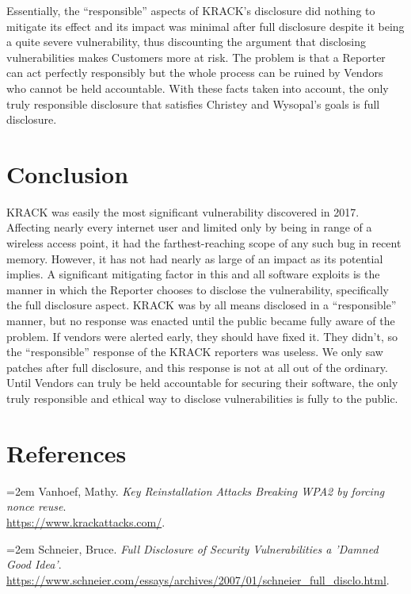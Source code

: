 \documentclass[12pt]{article}
\begin{document}
\begin{doublespace}
Essentially, the ``responsible'' aspects of KRACK's disclosure did nothing to
mitigate its effect and its impact was minimal after full disclosure despite it
being a quite severe vulnerability, thus discounting the argument that
disclosing vulnerabilities makes Customers more at risk. The problem is that a
Reporter can act perfectly
responsibly but the whole process can be ruined by Vendors who cannot be held
accountable. With these facts taken into account, the only truly responsible
disclosure that satisfies Christey and Wysopal's goals is full disclosure.

\section*{Conclusion}
KRACK was easily the most significant vulnerability discovered in 2017.
Affecting nearly every internet user and limited only by being in range of a
wireless access point, it had the farthest-reaching scope of any such bug in
recent memory. However, it has not had nearly as large of an impact as its
potential implies. A significant mitigating factor in this and all software
exploits is the manner in which the Reporter chooses to disclose the
vulnerability, specifically the full disclosure aspect. KRACK was by all means
disclosed in a ``responsible'' manner,
but no response was enacted until the public became fully aware of the
problem. If vendors were alerted early, they should
have fixed it. They didn't, so the ``responsible'' response of the KRACK
reporters was useless. We only saw patches after full
disclosure, and this response is not at all out of the ordinary. Until
Vendors can truly be held accountable for securing their software, the only
truly responsible and ethical way to disclose vulnerabilities is fully to
the public.

\end{doublespace}
\newpage
\section*{\hfil References \hfil}
\noindent \hangindent=2em
Vanhoef, Mathy.
\textit{Key Reinstallation Attacks Breaking WPA2 by forcing nonce reuse}. \\
\url{https://www.krackattacks.com/}.

\noindent \hangindent=2em
Schneier, Bruce.
\textit{Full Disclosure of Security Vulnerabilities a 'Damned Good Idea'}. \\
\url{https://www.schneier.com/essays/archives/2007/01/schneier_full_disclo.html}.
\end{document}
